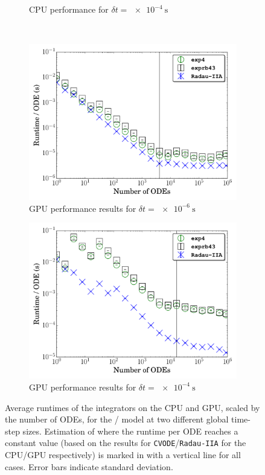 \documentclass[preprint,review,11pt]{elsarticle}
\begin{document}
\begin{figure}[htb]
\begin{subfigure}{0.49\textwidth}
      \caption{CPU performance for $\delta t = \SI{e-4}{\second}$}
      \label{F:h2_cpu_perf_large}
  \end{subfigure}\\
  \begin{subfigure}{0.49\textwidth}
      \includegraphics[width=\linewidth]{H2_1e-06_gpu.pdf}
      \caption{GPU performance results for $\delta t = \SI{e-6}{\second}$}
      \label{F:h2_gpu_perf_small}
  \end{subfigure}
  \begin{subfigure}{0.49\textwidth}
      \includegraphics[width=\linewidth]{H2_1e-04_gpu.pdf}
      \caption{GPU performance results for $\delta t = \SI{e-4}{\second}$}
      \label{F:h2_gpu_perf_large}
  \end{subfigure}
  \caption{Average runtimes of the integrators on the CPU and GPU, scaled by the number of ODEs, for the \slash{} model at two different global time-step sizes.
  Estimation of where the runtime per ODE reaches a constant value (based on the results for \texttt{CVODE}\slash\texttt{Radau-IIA} for the CPU\slash GPU respectively) is marked in with a vertical line for all cases.
  Error bars indicate standard deviation.}
  \label{F:H2_perf}
\end{figure}
\end{document}
